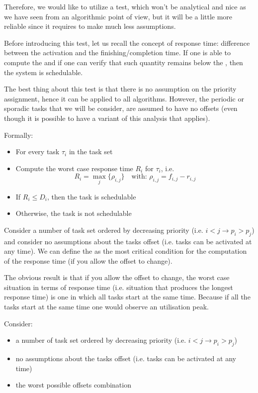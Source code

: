 Therefore, we would like to utilize a  test, which won't be analytical and nice as we have seen from an algorithmic point of view, but it will be a little more reliable since it requires to make much less assumptions.

Before introducing this test, let us recall the concept of response time: difference between the activation and the finishing/completion time. If one is able to compute the  and if one can verify that such quantity remains below the , then the system is schedulable.

The best thing about this test is that there is no assumption on the priority assignment, hence it can be applied to all algorithms. However, the periodic or sporadic tasks that we will be consider, are assumed to have no offsets (even though it is possible to have a variant of this analysis that applies).

Formally:
\begin{itemize}
\item For every task $\tau_i$ in the task set
\item Compute the worst case response time $R_i$ for $\tau_i$, i.e.
\[R_i = \max_j\{\rho_{i,j}\}\quad\text{with:}\,\,\rho_{i,j} = f_{i,j} - r_{i,j}\]
\item If $R_i \le D_i$, then the task is schedulable
\item Otherwise, the task is not schedulable
\end{itemize}

Consider a number of task set ordered by decreasing priority (i.e. $i < j \rightarrow p_i > p_j$) and consider no assumptions about the tasks offset (i.e. tasks can be activated at any time). We can define the  as the most critical condition for the computation of the response time (if you allow the offset to change).

The obvious result is that if you allow the offset to change, the worst case situation in terms of response time (i.e. situation that produces the longest response time) is one in which all tasks start at the same time. Because if all the tasks start at the same time one would observe an utilisation peak.

Consider:
\begin{itemize}
\item a number of task set ordered by decreasing priority (i.e. $i < j\rightarrow p_i > p_j$) 
\item no assumptions about the tasks offset (i.e. tasks can be activated at any time)
\item the worst possible offsets combination
\end{itemize}

